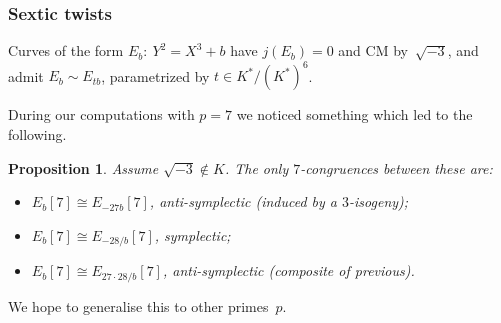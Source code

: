 \documentclass[compress]{beamer}
\newtheorem{prop}{Proposition}
\newcommand{\high}[1]{\emph{\color{blue}{#1}}}
\begin{document}
\begin{frame}\frametitle{Sextic twists}
  Curves of the form $E_b:\ Y^2=X^3+b$ have $j(E_b)=0$ and CM
  by~$\sqrt{-3}$, and admit \high{sextic twists} $E_b\sim E_{tb}$,
  parametrized by $t\in K^*/(K^*)^6$.

  \pause\medskip

  During our computations with $p=7$ we noticed something which led to
  the following.

  \pause\medskip

  \begin{prop}
  Assume $\sqrt{-3}\notin K$.  The only $7$-congruences between these
  are:
  \begin{itemize}
  \item $E_b[7]\cong E_{-27b}[7]$, anti-symplectic (induced by a
    $3$-isogeny);
  \item $E_b[7] \cong E_{-28/b}[7]$, symplectic;
  \item $E_b[7] \cong E_{27\cdot28/b}[7]$, anti-symplectic (composite of
    previous).
  \end{itemize}
  \end{prop}
  \pause\medskip

  We hope to generalise this to other primes~$p$.
\end{frame}

\end{document}
